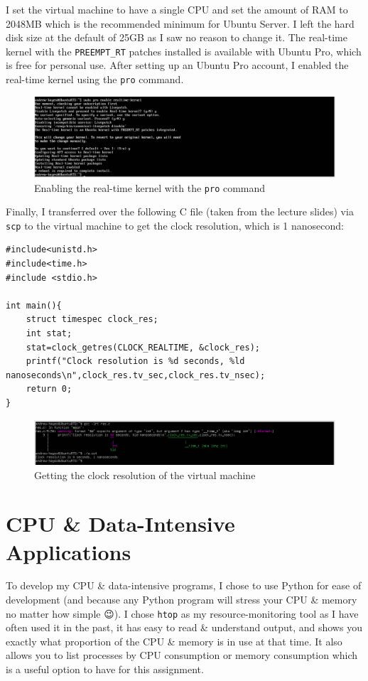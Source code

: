 \documentclass[a4paper]{article}
\newenvironment{code}{\captionsetup{type=listing}}{}
\begin{document}
I set the virtual machine to have a single CPU and set the amount of RAM to 2048MB which is the recommended minimum for Ubuntu Server\supercite{ubuntu_server_installation}.
I left the hard disk size at the default of 25GB as I saw no reason to change it.
The real-time kernel with the \verb|PREEMPT_RT| patches installed is available with Ubuntu Pro, which is free for personal use.
After setting up an Ubuntu Pro account, I enabled the real-time kernel using the \texttt{pro} command.

\begin{figure}[H]
    \centering
    \includegraphics[width=\textwidth]{./images/proenable.png}
    \caption{Enabling the real-time kernel with the \texttt{pro} command}
\end{figure}

Finally, I transferred over the following C file (taken from the lecture slides) via \texttt{scp} to the virtual machine to get the clock resolution, which is 1 nanosecond:
\begin{code}
\begin{verbatim}
#include<unistd.h>
#include<time.h>
#include <stdio.h>

int main(){
    struct timespec clock_res;
    int stat;
    stat=clock_getres(CLOCK_REALTIME, &clock_res);
    printf("Clock resolution is %d seconds, %ld nanoseconds\n",clock_res.tv_sec,clock_res.tv_nsec);
    return 0;
}
\end{verbatim}
\end{code}

\begin{figure}[H]
    \centering
    \includegraphics[width=\textwidth]{./images/clockres.png}
    \caption{Getting the clock resolution of the virtual machine}
\end{figure}

\section{CPU \& Data-Intensive Applications}
To develop my CPU \& data-intensive programs, I chose to use Python for ease of development (and because any Python program will stress your CPU \& memory no matter how simple {\emojifont 😉}).
I chose \texttt{htop} as my resource-monitoring tool as I have often used it in the past, it has easy to read \& understand output, and shows you exactly what proportion of the CPU \& memory is in use at that time.
It also allows you to list processes by CPU consumption or memory consumption which is a useful option to have for this assignment.
\end{document}
